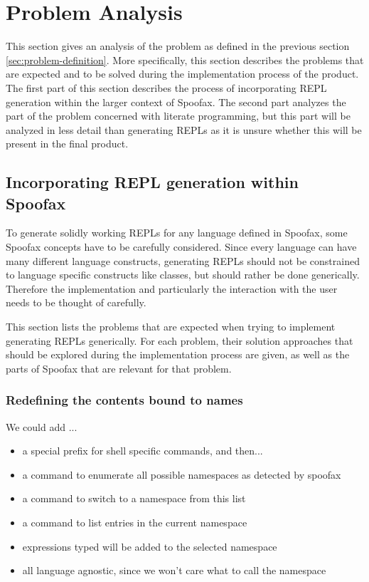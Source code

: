 \section{Problem Analysis}
\label{sec:problem-analysis}
This section gives an analysis of the problem as defined in the
previous section \ref{sec:problem-definition}. More specifically, this
section describes the problems that are expected and to be solved
during the implementation process of the product. The first part of
this section describes the process of incorporating REPL generation
within the larger context of Spoofax. The second part analyzes the
part of the problem concerned with literate programming, but this part
will be analyzed in less detail than generating REPLs as it is unsure
whether this will be present in the final product.

\subsection{Incorporating REPL generation within Spoofax}
\label{ssec:incorp-repl-gener}
To generate solidly working REPLs for any language defined in Spoofax,
some Spoofax concepts have to be carefully considered. Since every
language can have many different language constructs, generating REPLs
should not be constrained to language specific constructs like
classes, but should rather be done generically. Therefore the
implementation and particularly the interaction with the user needs to
be thought of carefully.

This section lists the problems that are expected when trying to
implement generating REPLs generically. For each problem, their
solution approaches that should be explored during the implementation
process are given, as well as the parts of Spoofax that are relevant
for that problem.

\subsubsection{Redefining the contents bound to names}
\label{sec:redef-cont-bound}
We could add ...
\begin{itemize}
\item a special prefix for shell specific commands, and then...
\item a command to enumerate all possible namespaces as detected by spoofax
\item a command to switch to a namespace from this list
\item a command to list entries in the current namespace
\item expressions typed will be added to the selected namespace
\item all language agnostic, since we won't care what to call the namespace
\end{itemize}

